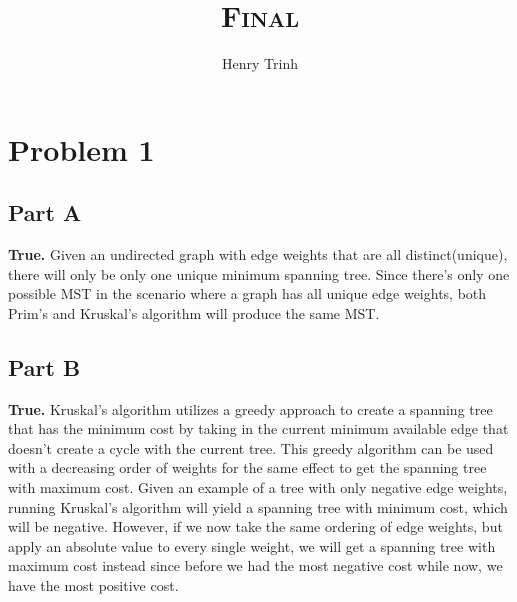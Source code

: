\documentclass[12pt]{article}
\title{\textsc{Final}}
\author{Henry Trinh}
\begin{document}
\maketitle

\newpage
\section*{Problem 1}
\subsection*{Part A}
\textbf{True.} Given an undirected graph with edge weights that are all distinct(unique), there will only be
only one unique minimum spanning tree. Since there's only one possible MST in the scenario where a graph 
has all unique edge weights, both Prim's and Kruskal's algorithm will produce the same MST.

\subsection*{Part B}
\textbf{True.} Kruskal's algorithm utilizes a greedy approach to create a spanning tree that has the minimum cost by
taking in the current minimum available edge that doesn't create a cycle with the current tree. This greedy algorithm 
can be used with a decreasing order of weights for the same effect to get the spanning tree with maximum cost. 
\newline
\newline
Given an example of a tree with only negative edge weights, running Kruskal's algorithm will yield a spanning tree with minimum cost, which will be negative. 
However, if we now take the same ordering of edge weights, but apply an absolute value to every single weight, we will get a spanning tree with maximum
cost instead since before we had the most negative cost while now, we have the most positive cost.
\end{document}
